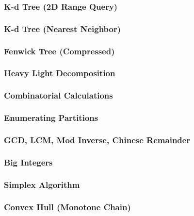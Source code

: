 \subsubsection*{K-d Tree (2D Range Query)}

\subsubsection*{K-d Tree (Nearest Neighbor)}

\subsubsection*{Fenwick Tree (Compressed)}

\subsubsection*{Heavy Light Decomposition}

\subsubsection*{Combinatorial Calculations}

\subsubsection*{Enumerating Partitions}

\subsubsection*{GCD, LCM, Mod Inverse, Chinese Remainder}

\subsubsection*{Big Integers}

\subsubsection*{Simplex Algorithm}

\subsubsection*{Convex Hull (Monotone Chain)}

